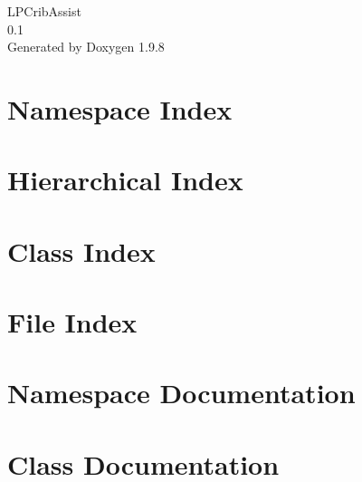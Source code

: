\documentclass[twoside]{book}
\newcommand{\+}{\discretionary{\mbox{\scriptsize$\hookleftarrow$}}{}{}}
\newcommand{\clearemptydoublepage}{%
    \newpage{\pagestyle{empty}\cleardoublepage}%
  }
\begin{document}
  \raggedbottom
    \hypersetup{pageanchor=false,
                bookmarksnumbered=true,
                pdfencoding=unicode
               }
  \begin{titlepage}
  \vspace*{7cm}
  \begin{center}%
  {\Large LPCrib\+Assist}\\
  [1ex]\large 0.\+1 \\
  \vspace*{1cm}
  {\large Generated by Doxygen 1.9.8}\\
  \end{center}
  \end{titlepage}
  \clearemptydoublepage
  \tableofcontents
  \clearemptydoublepage
  \hypersetup{pageanchor=true}
\chapter{Namespace Index}

\chapter{Hierarchical Index}

\chapter{Class Index}

\chapter{File Index}

\chapter{Namespace Documentation}



\chapter{Class Documentation}



























\end{document}
